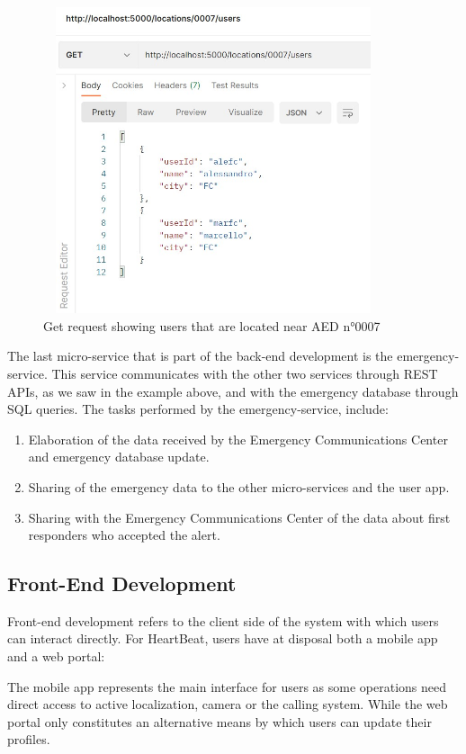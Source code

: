 \documentclass[11pt,a4paper]{article}
\begin{document}
\begin{figure}
    \centering
    \includegraphics[height=9cm, width=10cm]{images/get-api.jpg}
    \caption{Get request showing users that are located near AED n°0007}
    \label{fig:get}
\end{figure}

The last micro-service that is part of the back-end development is the emergency-service.
%
This service communicates with the other two services through REST APIs, as we saw in the example above, and with the emergency database through SQL queries.
%
The tasks performed by the emergency-service, include:

\begin{enumerate}
    \item Elaboration of the data received by the Emergency Communications Center and emergency database update.
    \item Sharing of the emergency data to the other micro-services and the user app.
    \item Sharing with the Emergency Communications Center of the data about first responders who accepted the alert.
\end{enumerate}

\subsection{Front-End Development}
Front-end development refers to the client side of the system with which users can interact directly.
%
For HeartBeat, users have at disposal both a mobile app and a web portal:

The mobile app represents the main interface for users as some operations need direct access to active localization, camera or the calling system.
%
While the web portal only constitutes an alternative means by which users can update their profiles.
\end{document}
